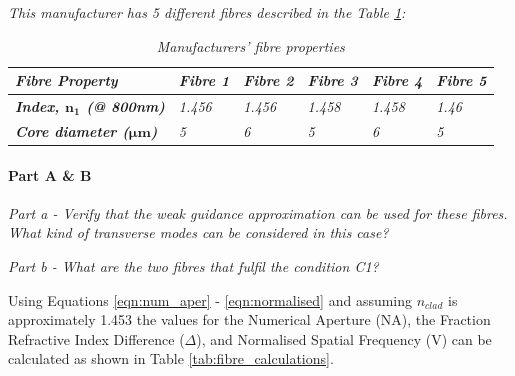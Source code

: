 \documentclass[colorlinks,11pt,a4paper,normalphoto,withhyper,ragged2e]{altareport}
\begin{document}
\medskip

\textit{This manufacturer has 5 different fibres described in the Table \ref{tab:manufacturers_fibre}: }

\smallskip

\begin{table}[h!]
    \centering
    \def\arraystretch{1.5}%
    \begin{tabular}{|p{3.5cm}|p{2cm}|p{2cm}|p{2cm}|p{2cm}|p{2cm}|}
    	\hline
    	
        \textit{\textbf{Fibre Property}} & \textit{\textbf{Fibre 1}} & \textit{\textbf{Fibre 2}} & \textit{\textbf{Fibre 3}} & \textit{\textbf{Fibre 4}} & \textit{\textbf{Fibre 5}} \\
        
        \hline
        
        \textit{\textbf{Index, $\textbf{n}_{\textbf{1}}$ (@ 800nm)}} & \textit{1.456} & \textit{1.456} & \textit{1.458} & \textit{1.458} & \textit{1.46} \\
        
        \hline
        
        \textit{\textbf{Core diameter ($\boldsymbol{\mu} \textbf{m}$)}} & \textit{5} & \textit{6} & \textit{5} & \textit{6} & \textit{5} \\
        
		\hline
    \end{tabular}
    \caption{\textit{Manufacturers' fibre properties}}
    \label{tab:manufacturers_fibre}
\end{table}

\medskip




\paragraph{Part A \& B \linebreak}
\textit{Part a - Verify that the weak guidance approximation can be used for these fibres. What kind of transverse modes can be considered in this case?} \linebreak

\textit{Part b - What are the two fibres that fulfil the condition C1?} \linebreak


Using Equations \ref{eqn:num_aper} - \ref{eqn:normalised} and assuming $n_{clad}$ is approximately 1.453 the values for the Numerical Aperture (NA), the Fraction Refractive Index Difference ($\Delta$), and Normalised Spatial Frequency (V) can be calculated as shown in Table \ref{tab:fibre_calculations}.
\end{document}
